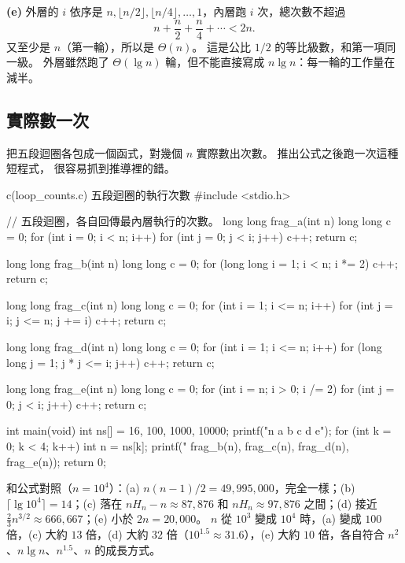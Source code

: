 \textbf{(e)} 外層的 $i$ 依序是 $n, \lfloor n/2 \rfloor, \lfloor n/4 \rfloor, \ldots,
1$，內層跑 $i$ 次，總次數不超過
\[
n + \frac{n}{2} + \frac{n}{4} + \cdots < 2n.
\]
又至少是 $n$（第一輪），所以是 $\Theta(n)$。 這是公比 $1/2$ 的等比級數，和第一項同
一級。 外層雖然跑了 $\Theta(\lg n)$ 輪，但不能直接寫成 $n \lg n$：每一輪的工作量在
減半。

\subsection{實際數一次}

把五段迴圈各包成一個函式，對幾個 $n$ 實際數出次數。 推出公式之後跑一次這種短程式，
很容易抓到推導裡的錯。

\begin{example}[label=ex:loop-counts]{c}{(loop\_counts.c) 五段迴圈的執行次數}
#include <stdio.h>

// 五段迴圈，各自回傳最內層執行的次數。
long long frag_a(int n)
{
    long long c = 0;
    for (int i = 0; i < n; i++)
        for (int j = 0; j < i; j++)
            c++;
    return c;
}

long long frag_b(int n)
{
    long long c = 0;
    for (long long i = 1; i < n; i *= 2)
        c++;
    return c;
}

long long frag_c(int n)
{
    long long c = 0;
    for (int i = 1; i <= n; i++)
        for (int j = i; j <= n; j += i)
            c++;
    return c;
}

long long frag_d(int n)
{
    long long c = 0;
    for (int i = 1; i <= n; i++)
        for (long long j = 1; j * j <= i; j++)
            c++;
    return c;
}

long long frag_e(int n)
{
    long long c = 0;
    for (int i = n; i > 0; i /= 2)
        for (int j = 0; j < i; j++)
            c++;
    return c;
}

int main(void)
{
    int ns[] = {16, 100, 1000, 10000};
    printf("n a b c d e\n");
    for (int k = 0; k < 4; k++) {
        int n = ns[k];
        printf("%
               frag_b(n), frag_c(n), frag_d(n), frag_e(n));
    }
    return 0;
}
\end{example}

和公式對照（$n = 10^4$）：(a) $n(n-1)/2 = 49{,}995{,}000$，完全一樣；(b)
$\lceil \lg 10^4 \rceil = 14$；(c) 落在 $nH_n - n \approx 87{,}876$ 和
$nH_n \approx 97{,}876$ 之間；(d) 接近 $\frac{2}{3} n^{3/2} \approx 666{,}667$；(e) 小於
$2n = 20{,}000$。 $n$ 從 $10^3$ 變成 $10^4$ 時，(a) 變成 $100$ 倍，(c) 大約 $13$
倍，(d) 大約 $32$ 倍（$10^{1.5} \approx 31.6$），(e) 大約 $10$ 倍，各自符合
$n^2$、$n \lg n$、$n^{1.5}$、$n$ 的成長方式。

